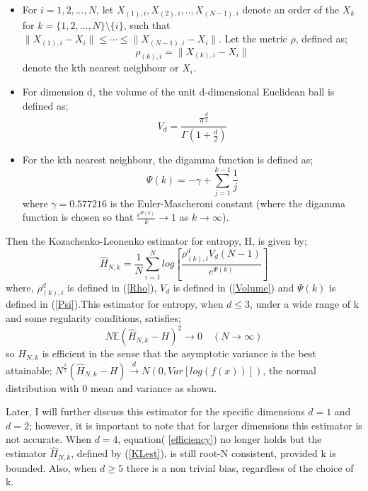 \documentclass{article}
\begin{document}
\begin{itemize}

\item For $i = 1, 2, ..., N$, let $X_{(1), i}, X_{(2), i}, .., X_{(N-1), i}$ denote an order of the $X_{k}$ for $k = \{1, 2, ..., N\} \setminus \{i\}$, such that $\| X_{(1), i} - X_{i}\| \leq \cdots \leq \|  X_{(N-1), i} - X_{i}\| $. Let the metric $\rho$, defined as;
\begin{equation} \label{Rho}
\rho_{(k), i} = \| X_{(k), i} - X_{i}\|
\end{equation} denote the kth nearest neighbour or $X_{i}$.

\item  For dimension d, the volume of the unit d-dimensional Euclidean ball is defined as;
\begin{equation} \label{Volume}
V_{d} = \frac{\pi^\frac{d}{2}}{\Gamma(1 + \frac{d}{2})}
\end{equation}

\item For the kth nearest neighbour, the digamma function is defined as;
\begin{equation} \label{Psi}
\Psi(k) = -\gamma + \sum_{j=1}^{k-1} \frac{1}{j}
\end{equation}
where $\gamma = 0.577216$ is the Euler-Mascheroni constant (where the digamma function is chosen so that $\frac{e^{\Psi(k)}}{k}\to1$ as $k \to \infty$).

\end{itemize} Then the Kozachenko-Leonenko estimator for entropy, H, is given by;
\begin{equation} \label{KLest}
\hat{H}_{N, k} = \frac{1}{N} \sum_{i=1}^{N} log \left[ \frac{\rho_{(k),i}^{d} V_{d} (N-1)}{e^{\Psi(k)}} \right]
\end{equation} where, $\rho_{(k),i}^{d}$ is defined in (\ref{Rho}), $V_{d}$ is defined in (\ref{Volume}) and $\Psi(k)$ is defined in (\ref{Psi}).This estimator for entropy, when $d \leq 3$, under a wide range of k and some regularity conditions, satisfies;
\begin{equation} \label{efficiency}
N \mathbb{E} {(\hat{H}_{N, k} - H)^2} \to 0 \quad  (N \to \infty)
\end{equation} so $\hat{H}_{N, k}$ is efficient in the sense that the asymptotic variance is the best attainable; $N^{\frac{1}{2}}(\hat{H}_{N, k} - H) \xrightarrow{d} N(0, Var[log(f(x))])$, the normal distribution with 0 mean and variance as shown.

Later, I will further discuss this estimator for the specific dimensions $d=1$ and $d=2$; however, it is important to note that for larger dimensions this estimator is not accurate. When $d=4$, equation( \ref{efficiency}) no longer holds but the estimator $\hat{H}_{N, k}$, defined by (\ref{KLest}), is still root-N consistent, provided k is bounded. Also, when $d \geq 5$ there is a non trivial bias, regardless of the choice of k. 
\end{document}

